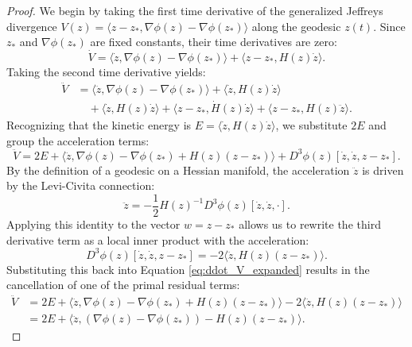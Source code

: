 \begin{proof}
We begin by taking the first time derivative of the generalized Jeffreys divergence $V(z) = \langle z - z_*, \nabla \phi(z) - \nabla \phi(z_*) \rangle$ along the geodesic $z(t)$. Since $z_*$ and $\nabla \phi(z_*)$ are fixed constants, their time derivatives are zero:
\begin{equation}
    \dot{V} = \langle \dot{z}, \nabla \phi(z) - \nabla \phi(z_*) \rangle + \langle z - z_*, H(z)\dot{z} \rangle.
\end{equation}
Taking the second time derivative yields:
\begin{align}
    \ddot{V} &= \langle \ddot{z}, \nabla \phi(z) - \nabla \phi(z_*) \rangle + \langle \dot{z}, H(z)\dot{z} \rangle \nonumber \\
             &\quad + \langle \dot{z}, H(z)\dot{z} \rangle + \langle z - z_*, \dot{H}(z)\dot{z} \rangle + \langle z - z_*, H(z)\ddot{z} \rangle.
\end{align}
Recognizing that the kinetic energy is $E = \langle \dot{z}, H(z)\dot{z} \rangle$, we substitute $2E$ and group the acceleration terms:
\begin{equation} \label{eq:ddot_V_expanded}
    \ddot{V} = 2E + \langle \ddot{z}, \nabla \phi(z) - \nabla \phi(z_*) + H(z)(z - z_*) \rangle + D^3\phi(z)[\dot{z}, \dot{z}, z - z_*].
\end{equation}
By the definition of a geodesic on a Hessian manifold, the acceleration $\ddot{z}$ is driven by the Levi-Civita connection:
\begin{equation}
    \ddot{z} = -\frac{1}{2} H(z)^{-1} D^3\phi(z)[\dot{z}, \dot{z}, \cdot].
\end{equation}
Applying this identity to the vector $w = z - z_*$ allows us to rewrite the third derivative term as a local inner product with the acceleration:
\begin{equation}
    D^3\phi(z)[\dot{z}, \dot{z}, z - z_*] = -2 \langle \ddot{z}, H(z)(z - z_*) \rangle.
\end{equation}
Substituting this back into Equation \ref{eq:ddot_V_expanded} results in the cancellation of one of the primal residual terms:
\begin{align}
    \ddot{V} &= 2E + \langle \ddot{z}, \nabla \phi(z) - \nabla \phi(z_*) + H(z)(z - z_*) \rangle - 2 \langle \ddot{z}, H(z)(z - z_*) \rangle \nonumber \\
             &= 2E + \langle \ddot{z}, (\nabla \phi(z) - \nabla \phi(z_*)) - H(z)(z - z_*) \rangle.
\end{align}

\end{proof}
